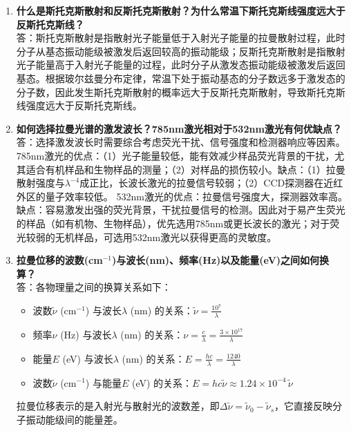 \begin{enumerate}[label=\arabic* 、, leftmargin=4em, labelsep=0pt]
    \item \textbf{什么是斯托克斯散射和反斯托克斯散射？为什么常温下斯托克斯线强度远大于反斯托克斯线？} \\
    答：斯托克斯散射是指散射光子能量低于入射光子能量的拉曼散射过程，此时分子从基态振动能级被激发后返回较高的振动能级；反斯托克斯散射是指散射光子能量高于入射光子能量的过程，此时分子从激发态振动能级被激发后返回基态。根据玻尔兹曼分布定律，常温下处于振动基态的分子数远多于激发态的分子数，因此发生斯托克斯散射的概率远大于反斯托克斯散射，导致斯托克斯线强度远大于反斯托克斯线。

    \item \textbf{如何选择拉曼光谱的激发波长？785nm激光相对于532nm激光有何优缺点？} \\
    答：选择激发波长时需要综合考虑荧光干扰、信号强度和检测器响应等因素。
    785nm激光的优点：（1）光子能量较低，能有效减少样品荧光背景的干扰，尤其适合有机样品和生物样品的测量；（2）对样品的损伤较小。缺点：（1）拉曼散射强度与$\lambda^{-4}$成正比，长波长激光的拉曼信号较弱；（2）CCD探测器在近红外区的量子效率较低。
    532nm激光的优点：拉曼信号强度大，探测器效率高。缺点：容易激发出强的荧光背景，干扰拉曼信号的检测。因此对于易产生荧光的样品（如有机物、生物样品），优先选用785nm或更长波长的激光；对于荧光较弱的无机样品，可选用532nm激光以获得更高的灵敏度。

    \item \textbf{拉曼位移的波数(cm$^{-1}$)与波长(nm)、频率(Hz)以及能量(eV)之间如何换算？} \\
    答：各物理量之间的换算关系如下：
    \begin{itemize}
        \item 波数$\tilde{\nu}$ (cm$^{-1}$) 与波长$\lambda$ (nm) 的关系：$\tilde{\nu} = \frac{10^7}{\lambda}$
        \item 频率$\nu$ (Hz) 与波长$\lambda$ (nm) 的关系：$\nu = \frac{c}{\lambda} = \frac{3\times10^{17}}{\lambda}$
        \item 能量$E$ (eV) 与波长$\lambda$ (nm) 的关系：$E = \frac{hc}{\lambda} = \frac{1240}{\lambda}$
        \item 波数$\tilde{\nu}$ (cm$^{-1}$) 与能量$E$ (eV) 的关系：$E = hc\tilde{\nu} \approx 1.24\times10^{-4}\,\tilde{\nu}$
    \end{itemize}
    拉曼位移表示的是入射光与散射光的波数差，即$\Delta\tilde{\nu} = \tilde{\nu}_0 - \tilde{\nu}_s$，它直接反映分子振动能级间的能量差。
\end{enumerate}
